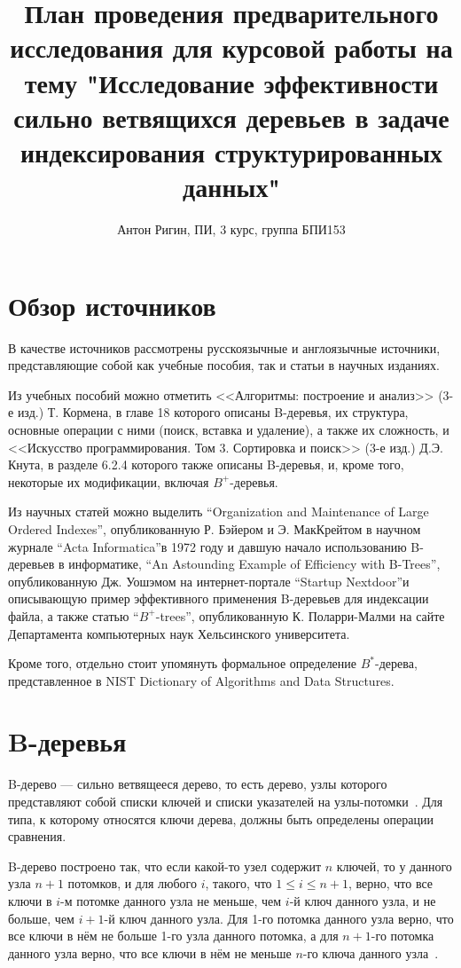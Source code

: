 \documentclass[a4paper,12pt]{article}
\title{План проведения предварительного исследования для курсовой работы на тему "Исследование эффективности сильно ветвящихся деревьев в задаче индексирования структурированных данных"}
\author{Антон Ригин, ПИ, 3 курс, группа БПИ153}
\date{}
\begin{document}
	
	\maketitle
	
	\section{Обзор источников}
	
	В качестве источников рассмотрены русскоязычные и англоязычные источники, представляющие собой как учебные пособия, так и статьи в научных изданиях.
	
	Из учебных пособий можно отметить <<Алгоритмы: построение и анализ>> (3-е изд.) Т. Кормена, в главе 18 которого описаны B-деревья, их структура, основные операции с ними (поиск, вставка и удаление), а также их сложность, и <<Искусство программирования. Том 3. Сортировка и поиск>> (3-е изд.) Д.Э. Кнута, в разделе 6.2.4 которого также описаны B-деревья, и, кроме того, некоторые их модификации, включая $B^+$-деревья.
	
	Из научных статей можно выделить \textquotedblleft Organization and Maintenance of Large Ordered Indexes\textquotedblright, опубликованную Р. Бэйером и Э. МакКрейтом в научном журнале \textquotedblleft Acta Informatica\textquotedblright в 1972 году и давшую начало использованию B-деревьев в информатике, \textquotedblleft An Astounding Example of Efficiency with B-Trees\textquotedblright, опубликованную Дж. Уошэмом на интернет-портале \textquotedblleft Startup Nextdoor\textquotedblright и описывающую пример эффективного применения B-деревьев для индексации файла, а также статью \textquotedblleft$B^+$-trees\textquotedblright, опубликованную К. Поларри-Малми на сайте Департамента компьютерных наук Хельсинского университета.
	
	Кроме того, отдельно стоит упомянуть формальное определение $B^*$-дерева, представленное в NIST Dictionary of Algorithms and Data Structures.
	
	\section{B-деревья}
	
	B-дерево --- сильно ветвящееся дерево, то есть дерево, узлы которого представляют собой списки ключей и списки указателей на узлы-потомки~\cite{Kormen}. Для типа, к которому относятся ключи дерева, должны быть определены операции сравнения.
	
	B-дерево построено так, что если какой-то узел содержит $n$ ключей, то у данного узла $n+1$ потомков, и для любого $i$, такого, что $1\le i\le n+1$, верно, что все ключи в $i$-м потомке данного узла не меньше, чем $i$-й ключ данного узла, и не больше, чем $i+1$-й ключ данного узла. Для 1-го потомка данного узла верно, что все ключи в нём не больше 1-го узла данного потомка, а для $n+1$-го потомка данного узла верно, что все ключи в нём не меньше $n$-го ключа данного узла~\cite{Kormen}.
	
\end{document}
